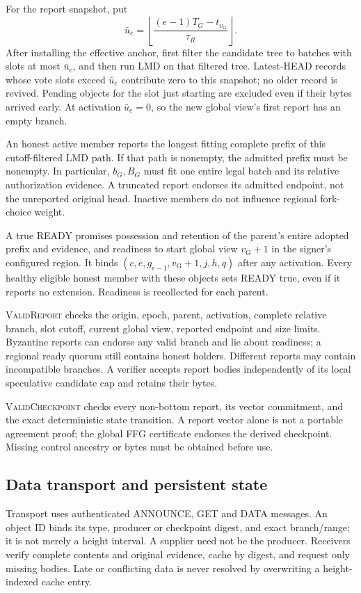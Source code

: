 \documentclass[11pt,a4paper,onecolumn]{article}
\newcommand{\gv}{v_{\mathrm G}}
\newcommand{\Proc}[1]{\textnormal{\textsc{#1}}}
\theoremstyle{remark}\newtheorem{example}[definition]{Example}
\begin{document}
For the report snapshot, put
\[
 \bar u_e=\left\lfloor\frac{(e-1)T_G-t_{\gv}}{\tau_R}\right\rfloor.
\]
After installing the effective anchor, first filter the candidate tree to
batches with slots at most $\bar u_e$, and then run LMD on that filtered tree.
Latest-HEAD records whose vote slots exceed $\bar u_e$ contribute zero to
this snapshot; no older record is revived. Pending objects for the slot just
starting are excluded even if their bytes arrived early. At activation
$\bar u_e=0$, so the new global view's first report has an empty branch.

An honest active member reports the longest fitting complete prefix of this
cutoff-filtered LMD path. If that path is nonempty, the admitted prefix must
be nonempty. In particular, $b_G,B_G$ must
fit one entire legal batch and its relative authorization evidence. A truncated
report endorses its admitted endpoint, not the unreported original head.
Inactive members do not influence regional fork-choice weight.

A true READY promises possession and retention of the parent's entire adopted
prefix and evidence, and readiness to start global view $\gv+1$ in the signer's
configured region. It binds $(c,e,g_{e-1},\gv+1,j,h,q)$ after any activation.
Every healthy eligible honest member with these objects sets READY true,
even if it reports no extension. Readiness is recollected for each parent.

\Proc{ValidReport} checks the origin, epoch, parent, activation, complete
relative branch, slot cutoff, current global view, reported endpoint and size
limits. Byzantine reports can endorse any valid branch and lie about readiness;
a regional ready quorum still contains honest holders. Different reports may
contain incompatible branches. A verifier accepts report bodies independently
of its local speculative candidate cap and retains their bytes.

\Proc{ValidCheckpoint} checks every non-bottom report, its vector commitment,
and the exact deterministic state transition. A report vector alone is not a
portable agreement proof; the global FFG certificate endorses the derived
checkpoint. Missing control ancestry or bytes must be obtained before use.

\subsection{Data transport and persistent state}\label{sec:transport}
Transport uses authenticated ANNOUNCE, GET and DATA messages. An object ID
binds its type, producer or checkpoint digest, and exact branch/range; it is
not merely a height interval. A supplier need not be the producer.
Receivers verify complete contents and original evidence, cache by digest,
and request only missing bodies. Late or conflicting data is never resolved
by overwriting a height-indexed cache entry.
\end{document}
